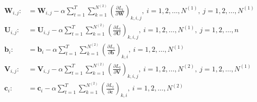 \documentclass{article}
\newcommand{\bm}[1]{\textbf{#1}}
\newcommand{\der}[2]{\frac{\partial #1}{\partial #2}}
\begin{document}
\begin{algorithm}
    \begin{algorithmic}
        \begin{align*}
            \bm{W}_{i,j} :&= \bm{W}_{i,j} - \alpha\sum_{t=1}^{T}\sum_{k=1}^{N^{(2)}} \left(\der{L_t}{\bm{W}}\right)_{k,i,j}, \ i=1,2,\dots,N^{(1)}, \ j=1,2,\dots,N^{(1)} \\
            \bm{U}_{i,j} :&= \bm{U}_{i,j} - \alpha\sum_{t=1}^{T}\sum_{k=1}^{N^{(2)}} \left(\der{L_t}{\bm{U}}\right)_{k,i,j}, \ i=1,2,\dots,N^{(1)}, \ j=1,2,\dots,n \\
            \bm{b}_i :&= \bm{b}_i - \alpha \sum_{t=1}^T \sum_{k=1}^{N^{(2)}} \left(\der{L_t}{\bm{b}}\right)_{k,i}, \ i=1,2,\dots,N^{(1)}\\
            \bm{V}_{i,j} :&= \bm{V}_{i,j} - \alpha\sum_{t=1}^{T}\sum_{k=1}^{N^{(2)}} \left(\der{L_t}{\bm{V}}\right)_{k,i,j}, \ i=1,2,\dots,N^{(2)}, \ j=1,2,\dots,N^{(1)} \\
            \bm{c}_i :&= \bm{c}_i - \alpha \sum_{t=1}^T \sum_{k=1}^{N^{(2)}} \left(\der{L_t}{\bm{c}}\right)_{k,i}, \ i=1,2,\dots,N^{(2)}
        \end{align*}
        \EndFunction
    \end{algorithmic}
\end{algorithm}
\end{document}
